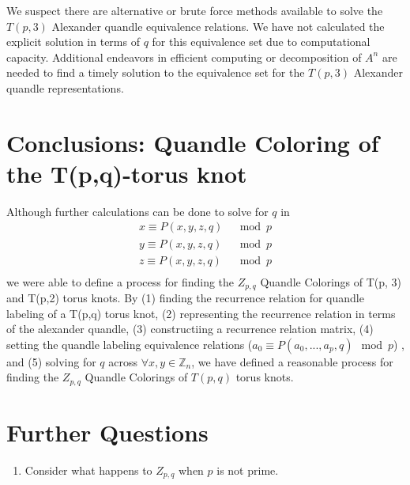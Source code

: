\documentclass[paper.tex]{subfiles}
\begin{document}
We suspect there are alternative or brute force methods available to solve the $T(p,3)$ Alexander quandle equivalence relations.  We have not calculated the explicit solution in terms of $q$ for this equivalence set due to computational capacity. Additional endeavors in efficient computing or decomposition of $A^{n}$ are needed to find a timely solution to the equivalence set for the $T(p,3)$ Alexander quandle representations. 

\section{Conclusions: Quandle Coloring of the T(p,q)-torus knot}\label{sec:2ntorus}
Although further calculations can be done to solve for $q$ in 
\begin{align*}
	x \equiv P(x,y,z,q) & \mod{p} \\
	y \equiv P(x,y,z,q) & \mod{p} \\
	z \equiv P(x,y,z,q) & \mod{p} \\
\end{align*}
we were able to define a process for finding the $Z_{p,q}$ Quandle Colorings of T(p, 3) and T(p,2) torus knots. By (1) finding the recurrence relation for quandle labeling of a T(p,q) torus knot, (2) representing the recurrence relation in terms of the alexander quandle, (3) constructiing a recurrence relation matrix,  (4) setting the quandle labeling equivalence relations ($a_{0} \equiv P(a_{0},...,a_{p},q) \mod{p}$) , and (5) solving for $q$ across $\forall x,y \in \mathbb{Z}_n$, we have defined a reasonable process for finding the $Z_{p,q}$ Quandle Colorings of $T(p,q)$ torus knots. 

\section{Further Questions}\label{fqs}

\begin{enumerate}
	\item Consider what happens to $Z_{p,q}$ when $p$ is not prime.
\end{enumerate}



\end{document}
